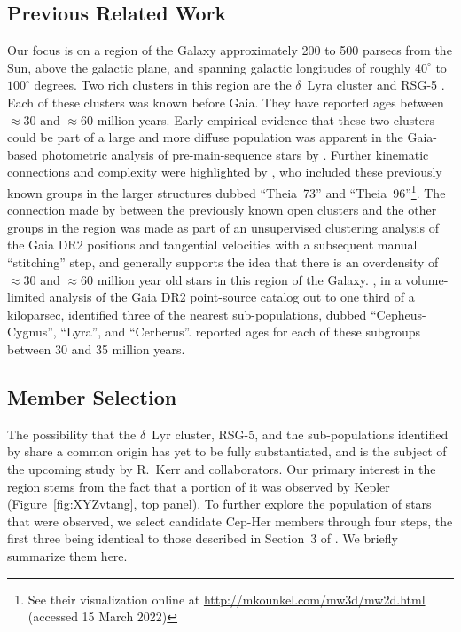 \documentclass[12pt,twocolumn,linenumbers]{aastex63}
\begin{document}
\subsection{Previous Related Work}

Our focus is on a region of the Galaxy approximately 200 to 500
parsecs from the Sun, above the galactic plane, and spanning galactic
longitudes of roughly $40^\circ$ to $100^\circ$ degrees.  Two rich
clusters in this region are the $\delta$~Lyra cluster
\citep{stephenson_possible_1959} and RSG-5 \citep{roser_nine_2016}.
Each of these clusters was known before Gaia.  They have reported ages
between $\approx$30 and $\approx$60 million years.  Early empirical
evidence that these two clusters could be part of a large and more
diffuse population was apparent in the Gaia-based photometric analysis
of pre-main-sequence stars by \citet[][see their Figures~11
and~13]{Zari2018}.  Further kinematic connections and complexity were
highlighted by \citet{KounkelCovey2019}, who included these previously
known groups in the larger structures dubbed ``Theia~73'' and
``Theia~96''\footnote{See their visualization online at
\url{http://mkounkel.com/mw3d/mw2d.html} (accessed 15 March 2022)}.
The connection made by \citet{KounkelCovey2019} between the previously
known open clusters and the other groups in the region was made as
part of an unsupervised clustering analysis of the Gaia DR2 positions
and tangential velocities with a subsequent manual ``stitching'' step,
and generally supports the idea that there is an overdensity of
$\approx$30 and $\approx$60 million year old stars in this region of
the Galaxy.  \citet{Kerr2021}, in a volume-limited analysis of the
Gaia DR2 point-source catalog out to one third of a kiloparsec,
identified three of the nearest sub-populations, dubbed
``Cepheus-Cygnus'', ``Lyra'', and ``Cerberus''.  \citet{Kerr2021}
reported ages for each of these subgroups between 30 and 35 million
years.


\subsection{Member Selection}
\label{subsec:members}


The possibility that the $\delta$~Lyr cluster, RSG-5, and the
sub-populations identified by \citet{Kerr2021} share a common origin
has yet to be fully substantiated, and is the subject of the upcoming
study by R.~Kerr and collaborators.  Our primary interest in the
region stems from the fact that a portion of it was observed by Kepler
(Figure~\ref{fig:XYZvtang}, top panel).  To further explore the
population of stars that were observed, we select candidate Cep-Her
members through four steps, the first three being identical to those
described in Section~3 of \citet{Kerr2021}.  We briefly summarize them
here.
\end{document}

